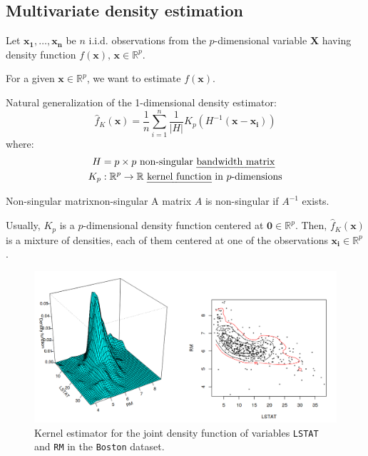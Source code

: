 \subsection{Multivariate density estimation}

Let $\boldsymbol{x_1}, \dots, \boldsymbol{x_n}$ be $n$ i.i.d. observations
from the $p$-dimensional variable $\boldsymbol{X}$ having density
function $f(\boldsymbol x),\,\boldsymbol x \in \mathbb{R}^p$.

For a given $\boldsymbol x \in \mathbb{R}^p$, we want to estimate $f(\boldsymbol x)$.

Natural generalization of the 1-dimensional density estimator:
\begin{equation*}
	\widehat{f}_K(\boldsymbol{x}) = \frac{1}{n}\sum_{i=1}^n
	\frac{1}{|H|}K_p\left(
	H^{-1}\left(\boldsymbol{x} - \boldsymbol{x_i}\right)
	\right)
\end{equation*}
where:
\begin{align*}
	H   & = p \times p \text{ non-singular \iemph{bandwidth matrix}}                             \\
	K_p & : \mathbb{R}^p \to \mathbb{R} \text{ \iemph{kernel function} in } p \text{-dimensions}
\end{align*}

\begin{definition}{Non-singular matrix}{non-singular}
	A matrix $A$ is non-singular if $A^{-1}$ exists.
\end{definition}

Usually, $K_p$ is a $p$-dimensional density function centered at $\boldsymbol{0} \in \mathbb{R}^p$.
Then, $\hat{f}_K(\boldsymbol{x})$ is a mixture of densities, each of them centered at one of
the observations $\boldsymbol{x_i} \in \mathbb{R}^p$.

\begin{figure}[H]
	\includegraphics{figures/multivariate-kernel-density}
	\caption{Kernel estimator for the joint density function of variables
		\texttt{LSTAT} and \texttt{RM} in the \texttt{Boston} dataset.}
\end{figure}

